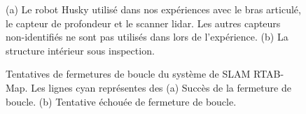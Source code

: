 \begin{figure}[htb]
\centerline{
}
	\centering
    \caption{
    (a) Le robot Husky utilisé dans nos expériences avec le bras articulé, le capteur de profondeur et le scanner lidar. Les autres capteurs non-identifiés ne sont pas utilisés dans lors de l'expérience.
    (b) La structure intérieur sous inspection.}
    \label{fig:husky_exp}
\end{figure}

\begin{figure}[ht]
  \centering
  \hfil
  \caption{
    Tentatives de fermetures de boucle du système de SLAM RTAB-Map. Les lignes cyan représentes des
    (a) Succès de la fermeture de boucle. (b) Tentative échouée de fermeture de boucle.
  }
  \label{fig:visual_loop_closure}
\end{figure}

